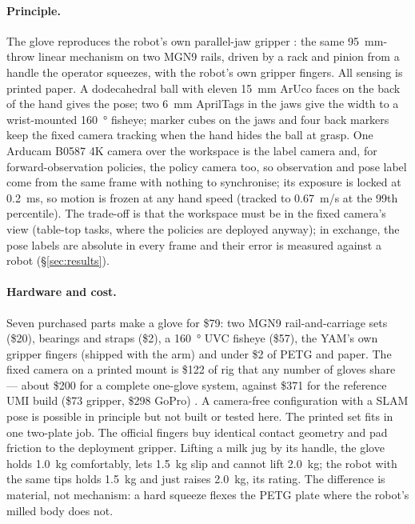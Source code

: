 \documentclass{article}
\begin{document}
\paragraph{Principle.}
The glove reproduces the robot's own parallel-jaw gripper \citep{i2rtyam}: the same \SI{95}{mm}-throw linear mechanism on two MGN9 rails, driven by a rack and pinion from a handle the operator squeezes, with the robot's own gripper fingers. All sensing is printed paper. A dodecahedral ball with eleven \SI{15}{mm} ArUco faces on the back of the hand gives the pose; two \SI{6}{mm} AprilTags in the jaws give the width to a wrist-mounted \SI{160}{\degree} fisheye; marker cubes on the jaws and four back markers keep the fixed camera tracking when the hand hides the ball at grasp. One Arducam B0587 4K camera over the workspace is the label camera and, for forward-observation policies, the policy camera too, so observation and pose label come from the same frame with nothing to synchronise; its exposure is locked at \SI{0.2}{ms}, so motion is frozen at any hand speed (tracked to \SI{0.67}{m/s} at the 99th percentile). The trade-off is that the workspace must be in the fixed camera's view (table-top tasks, where the policies are deployed anyway); in exchange, the pose labels are absolute in every frame and their error is measured against a robot (\S\ref{sec:results}).

\paragraph{Hardware and cost.}
Seven purchased parts make a glove for \$79: two MGN9 rail-and-carriage sets (\$20), bearings and straps (\$2), a \SI{160}{\degree} UVC fisheye (\$57), the YAM's own gripper fingers (shipped with the arm) and under \$2 of PETG and paper. The fixed camera on a printed mount is \$122 of rig that any number of gloves share --- about \$200 for a complete one-glove system, against \$371 for the reference UMI build (\$73 gripper, \$298 GoPro) \citep{chi2024umi}. A camera-free configuration with a SLAM pose is possible in principle but not built or tested here. The printed set fits in one two-plate job. The official fingers buy identical contact geometry and pad friction to the deployment gripper. Lifting a milk jug by its handle, the glove holds \SI{1.0}{kg} comfortably, lets \SI{1.5}{kg} slip and cannot lift \SI{2.0}{kg}; the robot with the same tips holds \SI{1.5}{kg} and just raises \SI{2.0}{kg}, its rating. The difference is material, not mechanism: a hard squeeze flexes the PETG plate where the robot's milled body does not.
\end{document}
